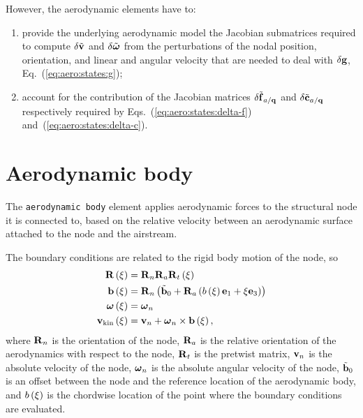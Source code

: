 However, the aerodynamic elements have to:
\begin{enumerate}

\item provide the underlying aerodynamic model the Jacobian submatrices
required to compute $\delta\tilde{\bm{\mathbf{v}}}$ and $\delta\tilde{\bm{\mathbf{\omega}}}$
from the perturbations of the nodal position, orientation,
and linear and angular velocity that are needed to deal with $\delta\bm{\mathbf{g}}$,
Eq.~(\ref{eq:aero:states:g});

\item account for the contribution of the Jacobian matrices
$\delta\tilde{\bm{\mathbf{f}}}_{a/\bm{\mathbf{q}}}$ and $\delta\tilde{\bm{\mathbf{c}}}_{a/\bm{\mathbf{q}}}$
respectively required by Eqs.~(\ref{eq:aero:states:delta-f})
and~(\ref{eq:aero:states:delta-c}).

\end{enumerate}




\section{Aerodynamic body}
The \texttt{aerodynamic body} element applies aerodynamic forces
to the structural node it is connected to,
based on the relative velocity between an aerodynamic surface attached 
to the node and the airstream.

The boundary conditions are related to the rigid body motion
of the node, so
\begin{subequations}
\begin{align}
	\bm{\mathbf{R}}\left( \xi \right)
	&=
	\bm{\mathbf{R}}_n \bm{\mathbf{R}}_a \bm{\mathbf{R}}_t\left( \xi \right)
	\\
	\bm{\mathbf{b}}\left( \xi \right)
	&=
	\bm{\mathbf{R}}_n\left( 
		\tilde{\bm{\mathbf{b}}}_0
		+ \bm{\mathbf{R}}_a \left( 
			b\left( \xi \right) \bm{\mathbf{e}}_1
			+ \xi \bm{\mathbf{e}}_3
		 \right)
	 \right)
	\\
	\bm{\mathbf{\omega}}\left( \xi \right)
	&=
	\bm{\mathbf{\omega}}_n
	\\
	\bm{\mathbf{v}}_{\text{kin}}\left( \xi \right)
	&=
	\bm{\mathbf{v}}_n + \bm{\mathbf{\omega}}_n \times \bm{\mathbf{b}}\left( \xi \right)
	,
\end{align}
\end{subequations}
where
$\bm{\mathbf{R}}_n$ is the orientation of the node,
$\bm{\mathbf{R}}_a$ is the relative orientation of the aerodynamics
with respect to the node,
$\bm{\mathbf{R}}_t$ is the pretwist matrix,
$\bm{\mathbf{v}}_n$ is the absolute velocity of the node,
$\bm{\mathbf{\omega}}_n$ is the absolute angular velocity of the node,
$\tilde{\bm{\mathbf{b}}}_0$ is an offset between the node and the reference location
of the aerodynamic body,
and $b\left( \xi \right)$ is the chordwise location of the point
where the boundary conditions are evaluated.

